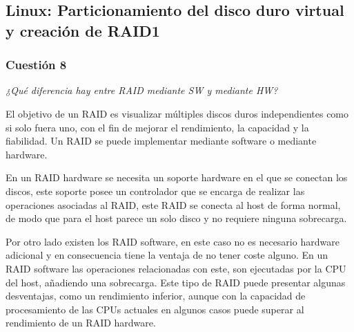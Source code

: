 \subsection{Linux: Particionamiento del disco duro virtual y creación de RAID1}
\subsubsection{Cuestión 8}
\textit{¿Qué diferencia hay entre RAID mediante SW y mediante HW?} \newline

El objetivo de un RAID es visualizar múltiples discos duros independientes como si solo fuera uno, con el fin de mejorar el rendimiento, la capacidad y la fiabilidad. Un RAID se puede implementar mediante software o mediante hardware.

En un RAID hardware se necesita un soporte hardware en el que se conectan los discos, este soporte posee un controlador que se encarga de realizar las operaciones asociadas al RAID, este RAID se conecta al host de forma normal, de modo que para el host parece un solo disco y no requiere ninguna sobrecarga.

Por otro lado existen los RAID software, en este caso no es necesario hardware adicional y en consecuencia tiene la ventaja de no tener coste alguno. En un RAID software las operaciones relacionadas con este, son ejecutadas por la CPU del host, añadiendo una sobrecarga. Este tipo de RAID puede presentar algunas desventajas, como un rendimiento inferior, aunque con la capacidad de procesamiento de las CPUs actuales en algunos casos puede superar al rendimiento de un RAID hardware. \cite{raid1} \cite{raid2}

